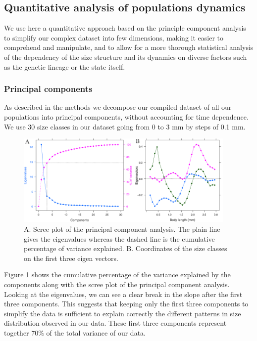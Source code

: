 {\begin{longtable}
\end{longtable}
}

\subsection{Quantitative analysis of populations dynamics}

We use here a quantitative approach based on the principle component analysis to
simplify our complex dataset into few dimensions, making it easier to comprehend
and manipulate, and to allow for a more thorough statistical analysis of the
dependency of the size structure and its dynamics on diverse factors such as the
genetic lineage or the state itself.

\subsubsection{Principal components}

As described in the methods we decompose our compiled dataset of all our
populations into principal components, without accounting for time dependence.
We use 30 size classes in our dataset going from 0 to 3 mm by steps of 0.1 mm.

\begin{figure}[!ht]
\begin{center}
\includegraphics[width=0.95\textwidth]{3-1_ChapExp1/Fig/AnnSP3}
\caption[Scree plot of the PCA and
coordinates of first components]{A. Scree plot of the principal component
analysis.
The plain line gives the eigenvalues whereas the dashed line is the cumulative percentage of variance explained. B. Coordinates of the size classes on the first three eigen
vectors.}
\label{fig:AnSP3}
\end{center}
\end{figure}

Figure \ref{fig:AnSP3} shows the cumulative percentage of the variance explained
by the components along with the scree plot of the principal component analysis.
Looking at the eigenvalues, we can see a clear break in the slope after the
first three components. This suggests that keeping only the first three
components to simplify the data is sufficient to explain correctly the different
patterns in size distribution observed in our data. These first three components
represent together $70\%$ of the total variance of our data.

